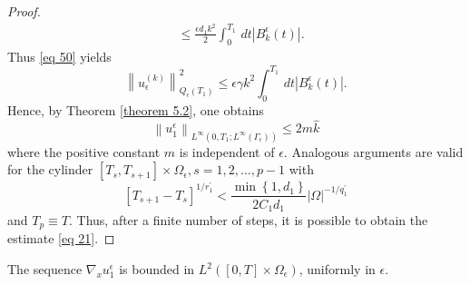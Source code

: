 \begin{proof}
\begin{equation}
\begin{aligned}
& \leq \frac{\epsilon d_{1} k^{2}}{2} \int_{0}^{T_{1}} \, d  t\left|B_{k}^{\epsilon}(t)\right| .
\end{aligned}
\label{eq 54}\end{equation}
Thus \eqref{eq 50} yields
\begin{equation}
  \left\|u_{\epsilon}^{(k)}\right\|_{Q_{\epsilon}\left(T_{1}\right)}^{2} \leq \epsilon \gamma k^{2} \int_{0}^{T_{1}} \, d  t\left|B_{k}^{\epsilon}(t)\right| .
\label{eq 55}\end{equation}
Hence, by Theorem \eqref{theorem 5.2}, one obtains
$$
\left\|u_{1}^{\epsilon}\right\|_{L^{\infty}\left(0, T_{1} ; L^{\infty}\left(\Gamma_{\epsilon}\right)\right)} \leq 2 m \hat{k}
$$
where the positive constant $m$ is independent of $\epsilon$. Analogous arguments are valid for the cylinder $\left[T_{s}, T_{s+1}\right] \times \Omega_{\epsilon}, s=1,2, \ldots, p-1$ with
$$
\left[T_{s+1}-T_{s}\right]^{1 / r_{1}^{\prime}}<\frac{\min \left\{1, d_{1}\right\}}{2 C_{1} d_{1}}|\Omega|^{-1 / q_{1}^{\prime}}
$$
and $T_{p} \equiv T$. Thus, after a finite number of steps, it is possible to obtain the estimate \eqref{eq 21}.
\end{proof}
\begin{lemma}
  The sequence $\nabla_{x} u_{1}^{\epsilon}$ is bounded in $L^{2}\left([0, T] \times \Omega_{\epsilon}\right)$, uniformly in $\epsilon$.
\label{lemma 5.4}\end{lemma}
